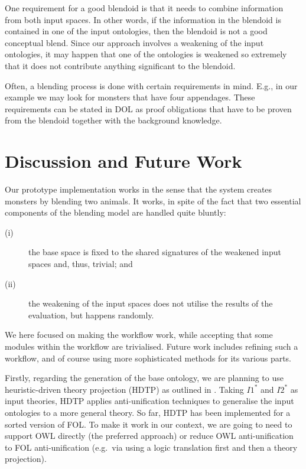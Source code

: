 \documentclass[letterpaper]{article}
\begin{document}
One requirement for a good blendoid is that it needs to combine information from 
both input spaces. In other words, if the information in the blendoid is contained
 in one of the input ontologies, then the blendoid is not a good conceptual blend. 
 Since our approach involves a weakening of the input ontologies, it may happen 
 that one of the ontologies is weakened so extremely that it does not contribute   
 anything significant to the blendoid. 


Often, a blending process is done with certain requirements in mind. E.g., 
in our example we may look for monsters that have four appendages. 
These requirements can be stated in DOL as proof obligations that have to 
be proven from the blendoid together with the background knowledge. 


\section{Discussion and Future Work}

Our prototype implementation works in the sense that the system creates monsters by blending two animals.
 It works, in spite of the fact that two essential components of the blending model are handled quite bluntly: 
 
 \begin{description}
\item[(i)] the base space is fixed to the shared signatures of the weakened input spaces and, thus,  trivial; and
\item[(ii)] the weakening of the input spaces does not utilise the results of the evaluation, but happens randomly. 
\end{description}

We here  focused on making the workflow work, while accepting that some modules within the workflow are trivialised. 
Future work includes refining such a workflow, and of course using more sophisticated methods for its various parts. 

Firstly, regarding the generation of the base ontology, we are planning to use heuristic-driven theory projection (HDTP) as outlined in \cite{Martinezetal2011,schweringEtAl09}. Taking $I1^*$ and $I2^*$ as input theories, HDTP  applies anti-unification techniques to generalise the input ontologies to a more general theory. So far, HDTP has been implemented for a sorted version of FOL. To make it work in our context, we are going to need to support OWL directly (the preferred approach) or reduce OWL anti-unification to FOL anti-unification (e.g.\ via using a logic translation first and then a theory projection).  
\end{document}
